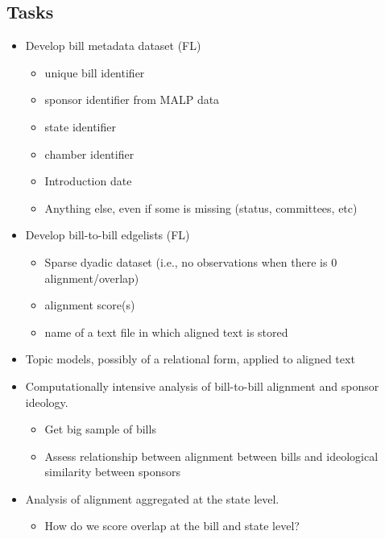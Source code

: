 \documentclass[12pt]{article} %
\begin{document}
\subsection{Tasks}
\begin{itemize}
\item Develop bill metadata dataset (FL)
\begin{itemize}
\item unique bill identifier
\item sponsor identifier from  MALP data
\item state identifier
\item chamber identifier
\item Introduction date
\item Anything else, even if some is missing (status, committees, etc)
\end{itemize}
\item Develop bill-to-bill edgelists (FL)
\begin{itemize}
\item Sparse dyadic dataset (i.e., no observations when there is 0 alignment/overlap)
\item alignment score(s)
\item name of a text file in which aligned text is stored
\end{itemize}
\item Topic models, possibly of a relational form, applied to aligned text
\item Computationally intensive analysis of bill-to-bill alignment and sponsor ideology.
\begin{itemize}
\item Get big sample of bills
\item Assess relationship between alignment between bills and ideological similarity between sponsors
\end{itemize}
\item Analysis of alignment aggregated at the state level.
\begin{itemize}
\item How do we score overlap at the bill and state level?
\end{itemize}

\end{itemize}




\end{document}
